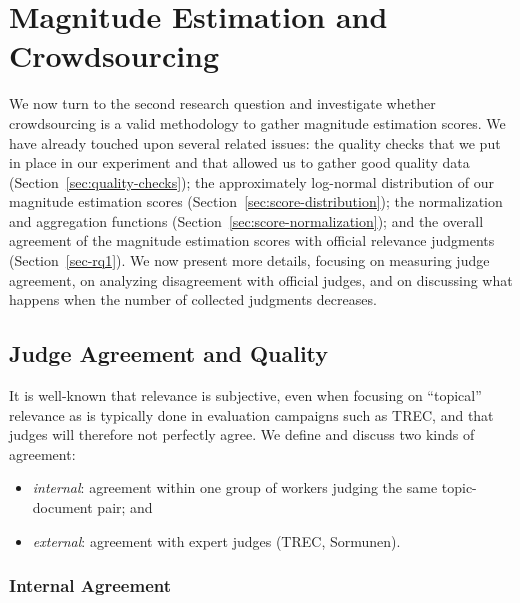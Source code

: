 \section{Magnitude Estimation and Crowdsourcing}
\label{sec:cs}

We now turn to the second research question and 
investigate whether crowdsourcing is a valid methodology to gather magnitude
estimation scores. 
We have already touched upon several related issues: the quality
checks that we put in place in our experiment and that allowed us to
gather good quality data (Section~\ref{sec:quality-checks}); the
approximately log-normal distribution of our magnitude estimation
scores (Section~\ref{sec:score-distribution}); the normalization and
aggregation functions (Section~\ref{sec:score-normalization}); and the
overall agreement of the magnitude estimation scores with official
relevance judgments (Section~\ref{sec-rq1}). 
We now present more details, focusing on measuring judge
agreement, on analyzing disagreement with official judges, and on
discussing what happens when the number of collected judgments 
decreases.

%

\subsection{Judge Agreement and Quality}
 \label{sec:judge-agreement}
It is well-known that relevance is subjective, even when focusing on
``topical'' relevance as is typically done in evaluation campaigns such
as TREC, and that judges will therefore not perfectly agree.
We define and discuss two kinds of agreement:
\begin{itemize}
\item \emph{internal}: agreement within one group of workers judging the
  same topic-document pair; and 
\item \emph{external}: agreement with expert judges (TREC,
  Sormunen). 
\end{itemize}
  
\subsubsection{Internal Agreement}
\label{sec:internal-agreement}

